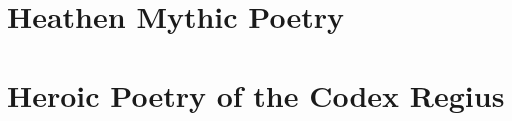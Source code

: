
\frontmatter%

%

\mainmatter%

\part{Heathen Mythic Poetry}%

\part{Heroic Poetry of the Codex Regius}%
	



